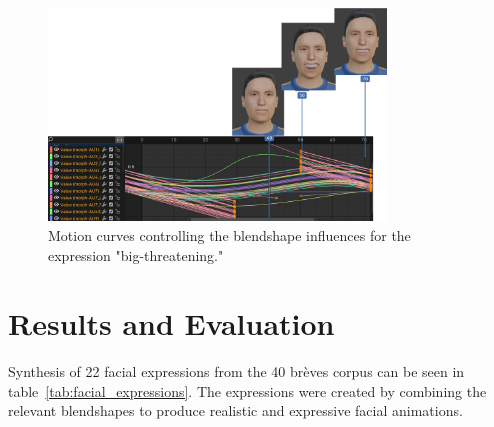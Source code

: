 \documentclass[../../main]{subfiles}
\begin{document}
\begin{figure}
    \centering
    \includegraphics[width=0.8\textwidth]{chapters/facial_expressions/images/motion_curve_example.png}
    \caption{Motion curves controlling the blendshape influences for the expression "big-threatening."}
    \label{ch:facial_expressions:fig:motion_curve_example}
\end{figure}

\section{Results and Evaluation}
\label{ch:facial_expressions:results}

Synthesis of 22 facial expressions from the 40 brèves corpus can be seen in table~\ref{tab:facial_expressions}. The expressions were created by combining the relevant blendshapes to produce realistic and expressive facial animations.
\end{document}
